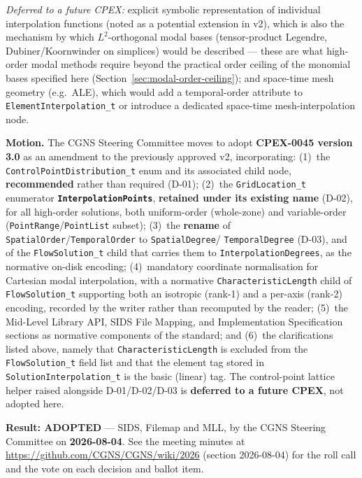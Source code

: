 \documentclass[11pt,letterpaper]{article}
\begin{document}
{\vspace{0.4em}
\noindent\textit{Deferred to a future CPEX:} explicit symbolic representation
of individual interpolation functions (noted as a potential extension in v2),
which is also the mechanism by which $L^2$-orthogonal modal bases
(tensor-product Legendre, Dubiner/Koornwinder on simplices) would be described ---
these are what high-order modal methods require beyond the practical order ceiling
of the monomial bases specified here (Section~\ref{sec:modal-order-ceiling});
and space-time mesh geometry (e.g.\ ALE), which would add a temporal-order
attribute to \texttt{ElementInterpolation\_t} or introduce a dedicated
space-time mesh-interpolation node.

\bigskip

\begin{motionbox}
\textbf{Motion.}
The CGNS Steering Committee moves to adopt \textbf{CPEX-0045 version 3.0}
as an amendment to the previously approved v2, incorporating:
(1)~the \texttt{ControlPointDistribution\_t} enum and its associated
child node, \textbf{recommended} rather than required (D-01); (2)~the
\texttt{GridLocation\_t} enumerator \textbf{\texttt{InterpolationPoints}},
\textbf{retained under its existing name} (D-02), for all high-order
solutions, both uniform-order (whole-zone) and variable-order
(\texttt{PointRange}/\texttt{PointList} subset); (3)~the \textbf{rename} of
\texttt{SpatialOrder}/\texttt{TemporalOrder} to \texttt{SpatialDegree}/
\texttt{TemporalDegree} (D-03), and of the \texttt{FlowSolution\_t} child that
carries them to \texttt{InterpolationDegrees}, as the normative on-disk
encoding; (4)~mandatory coordinate normalisation for Cartesian modal
interpolation, with a normative \texttt{CharacteristicLength} child of
\texttt{FlowSolution\_t} supporting both an isotropic (rank-1) and a per-axis
(rank-2) encoding, recorded by the writer rather than recomputed by the reader;
(5)~the Mid-Level Library API, SIDS File Mapping, and Implementation
Specification sections as normative components of the standard; and (6)~the
clarifications listed above, namely that \texttt{CharacteristicLength} is
excluded from the \texttt{FlowSolution\_t} field list and that the element tag
stored in \texttt{SolutionInterpolation\_t} is the basic (linear) tag.  The
control-point lattice helper raised alongside D-01/D-02/D-03 is
\textbf{deferred to a future CPEX}, not adopted here.

\medskip
\noindent\textbf{Result: ADOPTED} --- SIDS, Filemap and MLL, by the CGNS
Steering Committee on \textbf{2026-08-04}.  See the meeting minutes at
\url{https://github.com/CGNS/CGNS/wiki/2026} (section 2026-08-04) for the roll call
and the vote on each decision and ballot item.
\end{motionbox}

}%
\end{document}
